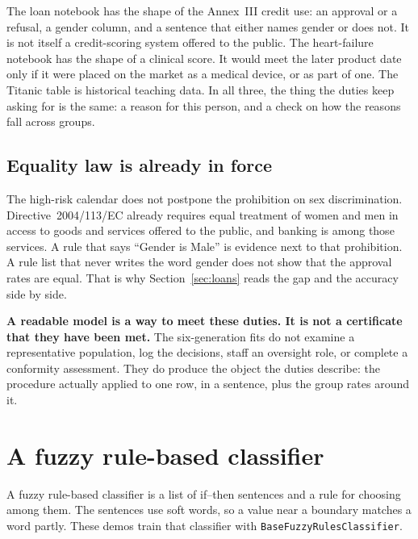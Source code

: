 \documentclass[11pt]{article}
\newcommand{\fn}[1]{\texttt{\small #1}}
\begin{document}
The loan notebook has the shape of the Annex~III credit use: an approval or a refusal, a gender column, and a sentence that either names gender or does not. It is not itself a credit-scoring system offered to the public. The heart-failure notebook has the shape of a clinical score. It would meet the later product date only if it were placed on the market as a medical device, or as part of one. The Titanic table is historical teaching data. In all three, the thing the duties keep asking for is the same: a reason for this person, and a check on how the reasons fall across groups.

\subsection{Equality law is already in force}

The high-risk calendar does not postpone the prohibition on sex discrimination. Directive~2004/113/EC already requires equal treatment of women and men in access to goods and services offered to the public, and banking is among those services. A rule that says ``Gender is Male'' is evidence next to that prohibition. A rule list that never writes the word gender does not show that the approval rates are equal. That is why Section~\ref{sec:loans} reads the gap and the accuracy side by side.

\begin{careful}
\textbf{A readable model is a way to meet these duties. It is not a certificate that they have been met.} The six-generation fits do not examine a representative population, log the decisions, staff an oversight role, or complete a conformity assessment. They do produce the object the duties describe: the procedure actually applied to one row, in a sentence, plus the group rates around it.
\end{careful}

\section{A fuzzy rule-based classifier}
\label{sec:rules}

A fuzzy rule-based classifier is a list of if--then sentences and a rule for choosing among them. The sentences use soft words, so a value near a boundary matches a word partly. These demos train that classifier with \fn{BaseFuzzyRulesClassifier}.
\end{document}
